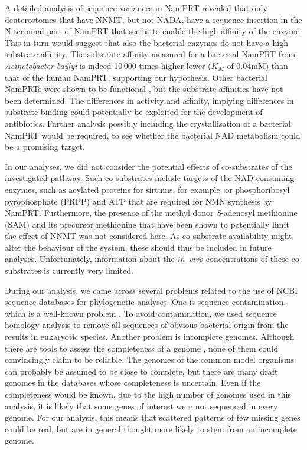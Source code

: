 A detailed analysis of sequence variances in NamPRT revealed that only deuterostomes that have NNMT, but not NADA, have a sequence insertion in the N-terminal part of NamPRT that seems to enable the high affinity of the enzyme. This in turn would suggest that also the bacterial enzymes do not have a high substrate affinity. The substrate affinity measured for a bacterial NamPRT from \textit{Acinetobacter baylyi} \citep{Sorci2010} is indeed 10\,000 times higher lower ($K_{M}$ of 0.04mM) than that of the human NamPRT, supporting our hypothesis. Other bacterial NamPRTs were shown to be functional \citep{Martin2001,Gerdes2006}, but the substrate affinities have not been determined. The differences in activity and affinity, implying differences in substrate binding could potentially be exploited for the development of antibiotics. Further analysis possibly including the crystallisation of a bacterial NamPRT would be required, to see whether the bacterial NAD metabolism could be a promising target.


In our analyses, we did not consider the potential effects of co-substrates of the investigated pathway. Such co-substrates include targets of the NAD-consuming enzymes, such as acylated proteins for sirtuins, for example, or phosphoribosyl pyrophosphate (PRPP) and ATP that are required for NMN synthesis by NamPRT. Furthermore, the presence of the methyl donor \textit{S}-adenosyl methionine (SAM) and its precursor methionine that have been shown to potentially limit the effect of NNMT \citep{Ulanovskaya2013} was not considered here. As co-substrate availability might alter the behaviour of the system, these should thus be included in future analyses. Unfortunately, information about the \textit{in~vivo} concentrations of these co-substrates is currently very limited.

During our analysis, we came across several problems related to the use of NCBI sequence databases for phylogenetic analyses. One is sequence contamination, which is a well-known problem \citep{Ballenghien2017,Longo2011}. To avoid contamination, we used sequence homology analysis to remove all sequences of obvious bacterial origin from the results in eukaryotic species. Another problem is incomplete genomes. Although there are tools to assess the completeness of a genome \citep[e.g.][]{Simao2015}, none of them could convincingly claim to be reliable. The genomes of the common model organisms can probably be assumed to be close to complete, but there are many draft genomes in the databases whose completeness is uncertain. Even if the completeness would be known, due to the high number of genomes used in this analysis, it is likely that some genes of interest were not sequenced in every genome. For our analysis, this means that scattered patterns of few missing genes could be real, but are in general thought more likely to stem from an incomplete genome.

